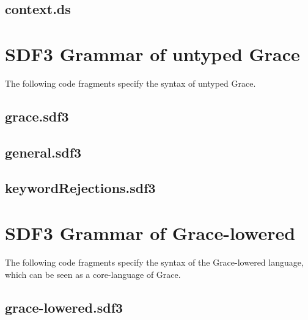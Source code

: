 \documentclass[a4paper,UKenglish]{lipics-v2016}
\begin{document}
\subsection{context.ds}


\section{SDF3 Grammar of untyped Grace}
The following code fragments specify the syntax of untyped Grace.

\subsection{grace.sdf3}

\subsection{general.sdf3}

\subsection{keywordRejections.sdf3}


\section{SDF3 Grammar of Grace-lowered}
The following code fragments specify the syntax of the Grace-lowered language, which can be seen as a core-language of Grace.

\subsection{grace-lowered.sdf3}






\end{document}
